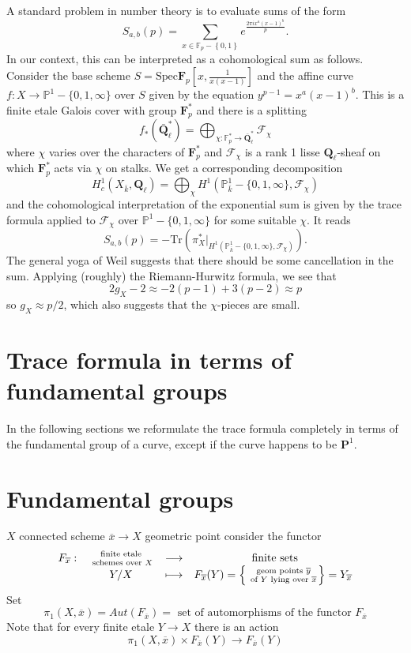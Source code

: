 \noindent
A standard problem in number theory is to evaluate sums of the form
$$
S_{a,b}(p) = \sum_{x\in \mathbb F_p-\left\{0, 1\right\}} e^{\frac{2\pi
ix^a(x-1)^b}{p}}.
$$
In our context, this can be interpreted as a cohomological sum as follows.
Consider the base scheme $S = \text{Spec} \mathbf{F}_p\left[x,
\frac{1}{x(x-1)}\right]$ and the affine curve $f: X \to \mathbb P^1-\{0, 1,
\infty\}$ over $S$ given by the equation $y^{p-1} = x^a(x-1)^b$. This is a
finite etale Galois cover with group $\mathbf{F}_p^*$ and there is a splitting
$$
f_*(\bar{\mathbf{Q}}_\ell^*) =
\bigoplus_{\chi : \mathbb F_p^*\to \bar{\mathbf{Q}}_\ell^*} \mathcal{F}_\chi
$$
where $\chi$ varies over the characters of $\mathbf{F}_p^*$ and
$\mathcal{F}_\chi$ is a rank 1 lisse $\mathbf{Q}_\ell$-sheaf on which
$\mathbf{F}_p^*$ acts via $\chi$ on stalks. We get a corresponding decomposition
$$
H_c^1(X_{\bar k}, \mathbf{Q}_\ell) = \bigoplus_\chi H^1(\mathbb P_{\bar
k}^1-\{0, 1, \infty\}, \mathcal{F}_\chi)
$$
and the cohomological interpretation of the exponential sum is given by the
trace formula applied to $\mathcal{F}_\chi$ over $\mathbb P^1 - \{0, 1,
\infty\}$ for some suitable $\chi$. It reads
$$
S_{a,b}(p) = -\text{Tr}\left(\pi_X^*\big|_{H^1(\mathbb P_{\bar k}^1-\{0, 1,
\infty\}, \mathcal{F}_\chi)}\right).
$$
The general yoga of Weil suggests that there should be some cancellation in the
sum. Applying (roughly) the Riemann-Hurwitz formula, we see that
$$
2g_X-2 \approx -2 (p-1) + 3(p-2) \approx p
$$
so $g_X\approx p/2$, which also suggests that the $\chi$-pieces are small.



\section{Trace formula in terms of fundamental groups}
\label{section-trace-formual-fundamental-group}

\noindent
In the following sections we reformulate the trace formula completely
in terms of the fundamental group of a curve, except if the curve
happens to be $\mathbf{P}^1$.




\section{Fundamental groups}
\label{section-fundamental-groups}

\noindent
$X$ connected scheme $\overline x\to X$ geometric
point consider the functor
$$
\begin{matrix}
F_{\overline x}: &
\text{ finite etale }\atop \text{ schemes over } X &
\longrightarrow & \text{ finite sets} \\
&
Y/X &
\longmapsto &
F_{\overline x}(Y) =
\left\{\text{ geom points }\overline y\atop \text{ of } Y
\text{ lying over }\overline x\right\} = Y_{\overline x}
\end{matrix}
$$
Set
$$
\pi_1(X, \overline x)
=
Aut(F_{\overline x})
=
\text{ set of automorphisms of the functor }F_{\overline x}
$$
Note that for every finite etale $Y \to X$ there is an action
$$
\pi_1(X, \overline x) \times F_{\overline x}(Y) \to F_{\overline x}(Y)
$$

